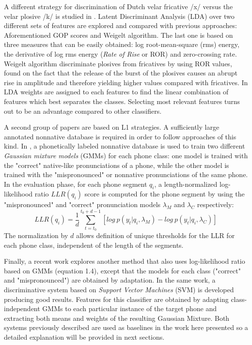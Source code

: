 A different strategy for discrimination of Dutch velar fricative /x/ versus the velar plosive
/k/ is studied in \cite{lda_weigelt}. Latent Discriminant Analysis (LDA) over two different sets
of features are explored and compared with previous approaches: Aforementioned GOP scores and
Weigelt algorithm. The last one is based on three measures that can be easily obtained:
log root-mean-square (rms) energy, the derivative of log rms energy (\textit{Rate of Rise} or
ROR) and zero-crossing rate. Weigelt algorithm discriminate plosives from fricatives by using
ROR values, found on the fact that the release of the burst of the plosives causes an abrupt
rise in amplitude and therefore yielding higher values compared with fricatives.
In LDA weights are assigned to each features to find the linear combination of features
which best separates the classes. Selecting most relevant features turns out to be an
advantage compared to other classifiers.

A second group of papers are based on L1 strategies. A sufficiently large annotated nonnative
database is required in order to follow approaches of this kind.
In \cite{detection_phone_level_mispronunciation_learning}, a phonetically labeled nonnative
database is used to train two different \textit{Gaussian mixture models} (GMMs) for each phone
class: one model is trained with the "correct" native-like pronunciations of a phone, while the
other model is trained with the "mispronounced" or nonnative pronunciations of the same phone.
In the evaluation phase, for each phone segment $q_{i}$, a length-normalized log-likelihood ratio
$LLR(q_{i})$ score is computed for the phone segment by using the "mispronounced" and "correct"
pronunciation models $\lambda_{M}$ and $\lambda_{C}$ respectively:
\begin{equation}
LLR(q_{i}) = \frac{1}{d}\sum_{t=t_{0}}^{t_{0}+d-1} [log \ p(y_{t}|q_{i}, \lambda_{M}) - log \ p(y_{t}|q_{i}, \lambda_{C})]
\end{equation}
The normalization by $d$ allows definition of unique thresholds for the LLR for each phone class, 
independent of the length of the segments.

Finally, a recent work \cite{main} explores another method that also uses 
log-likelihood ratio based on  GMMs (equation 1.4), except that the models for each 
class ("correct" and  "mispronounced") are obtained by adaptation. In the same work, 
a discriminative system based
on \textit{Support Vector Machines} (SVM) is developed producing good results. Features 
for this classifier are obtained by adapting class-independent GMMs to each particular 
instance of the target phone and extracting both means and weights of the resulting 
Gaussian Mixture.
Both systems
previously described are used as baselines in the work here presented so a detailed explanation
will be provided in next sections.

